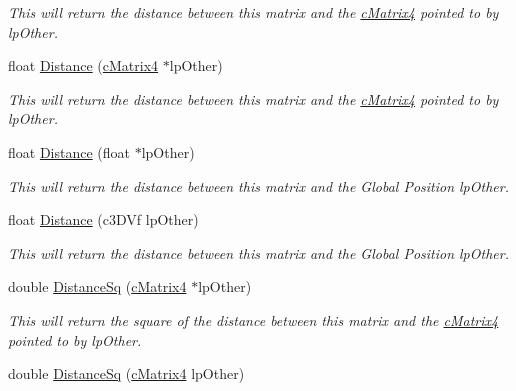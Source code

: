 \begin{DoxyCompactItemize}
\begin{DoxyCompactList}\small\item\em This will return the distance between this matrix and the \hyperlink{classc_matrix4}{cMatrix4} pointed to by lpOther. \end{DoxyCompactList}\item 
\hypertarget{classc_matrix4_acd04bb06d1d12807b203b0aaf9e9b608}{
float \hyperlink{classc_matrix4_acd04bb06d1d12807b203b0aaf9e9b608}{Distance} (\hyperlink{classc_matrix4}{cMatrix4} $\ast$lpOther)}
\label{classc_matrix4_acd04bb06d1d12807b203b0aaf9e9b608}

\begin{DoxyCompactList}\small\item\em This will return the distance between this matrix and the \hyperlink{classc_matrix4}{cMatrix4} pointed to by lpOther. \end{DoxyCompactList}\item 
\hypertarget{classc_matrix4_a83fd4655f67a81cb42f3c50262ec593e}{
float \hyperlink{classc_matrix4_a83fd4655f67a81cb42f3c50262ec593e}{Distance} (float $\ast$lpOther)}
\label{classc_matrix4_a83fd4655f67a81cb42f3c50262ec593e}

\begin{DoxyCompactList}\small\item\em This will return the distance between this matrix and the Global Position lpOther. \end{DoxyCompactList}\item 
\hypertarget{classc_matrix4_a33661efb10e41c9e1f84a399113e235c}{
float \hyperlink{classc_matrix4_a33661efb10e41c9e1f84a399113e235c}{Distance} (c3DVf lpOther)}
\label{classc_matrix4_a33661efb10e41c9e1f84a399113e235c}

\begin{DoxyCompactList}\small\item\em This will return the distance between this matrix and the Global Position lpOther. \end{DoxyCompactList}\item 
\hypertarget{classc_matrix4_afb4a1edc36d2de9330e48bd182fe2a9b}{
double \hyperlink{classc_matrix4_afb4a1edc36d2de9330e48bd182fe2a9b}{DistanceSq} (\hyperlink{classc_matrix4}{cMatrix4} $\ast$lpOther)}
\label{classc_matrix4_afb4a1edc36d2de9330e48bd182fe2a9b}

\begin{DoxyCompactList}\small\item\em This will return the square of the distance between this matrix and the \hyperlink{classc_matrix4}{cMatrix4} pointed to by lpOther. \end{DoxyCompactList}\item 
\hypertarget{classc_matrix4_ad225d8db157a99b593f774e08c266722}{
double \hyperlink{classc_matrix4_ad225d8db157a99b593f774e08c266722}{DistanceSq} (\hyperlink{classc_matrix4}{cMatrix4} lpOther)}
\label{classc_matrix4_ad225d8db157a99b593f774e08c266722}


\end{DoxyCompactItemize}
